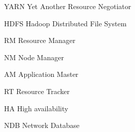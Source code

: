 \begin{basedescript}{\desclabelstyle{\pushlabel}\desclabelwidth{10em}}
\item[YARN] Yet Another Resource Negotiator
  \cite{Vavilapalli:2013:AHY:2523616.2523633}
\item[HDFS] Hadoop Distributed File System \cite{hdfs}
\item[RM] Resource Manager
\item[NM] Node Manager
\item[AM] Application Master
\item[RT] Resource Tracker
\item[HA] High availability
\item[NDB] Network Database
\end{basedescript}
